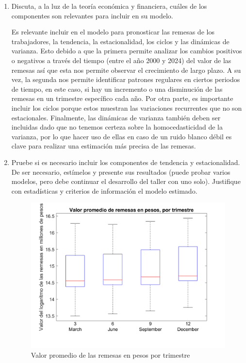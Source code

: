 \documentclass{article}
\theoremstyle{remark}
\theoremstyle{definition}
\begin{document}
\begin{enumerate}[label=\emph{\alph*})]
    \item {Discuta, a la luz de la teor\'ia econ\'omica y financiera, cu\'ales de los componentes son relevantes para incluir en su modelo.}
        \begin{tcolorbox}[title=Soluci\'on 3.b]
            Es relevante incluir en el modelo para pronosticar las remesas de los trabajadores, la tendencia, la estacionalidad, los ciclos y las dinámicas de varianza. Esto debido a que la primera permite analizar los cambios positivos o negativos a través del tiempo (entre el año 2000 y 2024) del valor de las remesas así que esta nos permite observar el crecimiento de largo plazo. A su vez, la segunda nos permite identificar patrones regulares en ciertos periodos de tiempo, en este caso, si hay un incremento o una disminución de las remesas en un trimestre específico cada año. Por otra parte, es importante incluir los ciclos porque estos muestran las variaciones recurrentes que no son estacionales. Finalmente, las dinámicas de varianza también deben ser incluidas dado que no tenemos certeza sobre la homocedasticidad de la varianza, por lo que hacer uso de ellas en caso de un ruido blanco débil es clave para realizar una estimación más precisa de las remesas. 
           
                
        \end{tcolorbox}
    \item {Pruebe si es necesario incluir los componentes de tendencia y estacionalidad. De ser necesario, est\'imelos y presente sus resultados (puede probar varios modelos, pero debe continuar el desarrollo del taller con uno solo). Justifique con estad\'isticas y criterios de informaci\'on el modelo estimado.}
        
        
        \begin{tcolorbox}[title=Soluci\'on 3.c]

        \begin{figure}[H]
            \centering
            \includegraphics[width=0.5\linewidth]{docs/Remesas_Boxplot.png}
            \caption{Valor promedio de las remesas en pesos por trimestre}
            \label{fig:enter-label}
        \end{figure}
        

\end{tcolorbox}
\end{enumerate}
\end{document}
